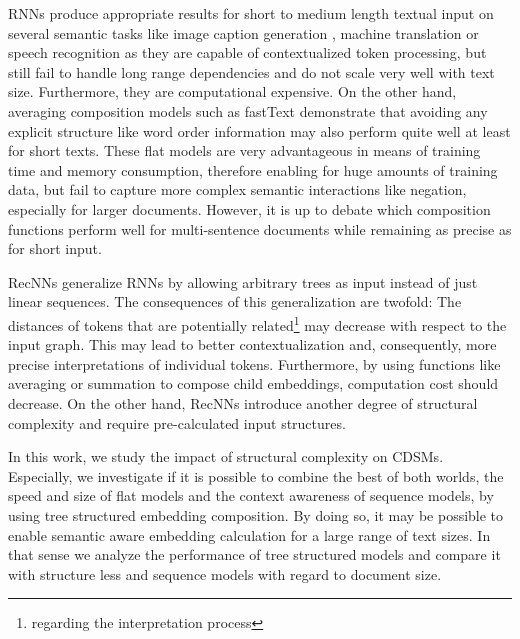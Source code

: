 \acp{RNN} produce appropriate results for short to medium length textual input on several semantic tasks like image caption generation  \autocite{vinyals_show_2014}, machine translation \autocite{wu_googles_2016} or speech recognition \autocite{xiong_microsoft_2017} as they are capable of contextualized token processing, but still fail to handle long range dependencies and do not scale  very well with text size. Furthermore, they are computational expensive. On the other hand, averaging composition models such as fastText \autocite{joulin_bag_2017} demonstrate that avoiding any explicit structure like word order information %
may also perform quite well at least for short texts. These flat models are very advantageous in means of training time and memory consumption, therefore enabling for huge amounts of training data, but fail to capture more complex semantic interactions like negation, especially for larger documents. However, it is up to debate which composition functions perform well for multi-sentence documents while remaining as precise as for short input.%

\acp{RecNN} \autocite{goller_learning_1996,socher_parsing_2011} generalize \acp{RNN} by allowing arbitrary trees as input instead of just linear sequences. The consequences of this generalization are twofold: The distances of tokens that are potentially related\footnote{regarding the interpretation process} may decrease with respect to the input graph. This may lead to better  contextualization and, consequently, more precise interpretations of individual tokens. Furthermore, by using functions like averaging or summation to compose child embeddings, computation cost should decrease. On the other hand, \acp{RecNN} introduce another degree of structural complexity and require pre-calculated input structures.%

In this work, we study the impact of structural complexity on \acp{CDSM}. Especially, we investigate if it is possible to combine the best of both worlds, the speed and size of flat models and the context awareness of sequence models, by using tree structured embedding composition. By doing so, it may be possible to enable semantic aware embedding calculation for a large range of text sizes. In that sense we analyze the performance of tree structured models and compare it with structure less and sequence models with regard to document size.


